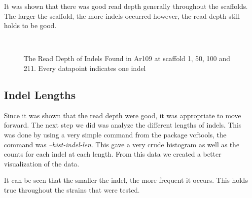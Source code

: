 \documentclass[12pt]{article}
\begin{document}
It was shown that there was good read depth generally throughout the scaffolds. The larger the scaffold, the more indels occurred however, the read depth still holds to be good. 

\begin{figure}[H]
	\begin{centering}
		\\
		\begin{singlespace}
			\vspace{-0.5cm}
			\caption[The Read Depth of Indels Found]{The Read Depth of Indels Found in Ar109 at scaffold 1, 50, 100 and 211. Every datapoint indicates one indel}\label{readdepth_indel}
		\end{singlespace}
	\end{centering}
\end{figure}

\subsection{Indel Lengths}  

Since it was shown that the read depth were good, it was appropriate to move forward. The next step we did was analyze the different lengths of indels. This was done by using a very simple command from the package vcftools, the command was \textit{--hist-indel-len}. This gave a very crude histogram as well as the counts for each indel at each length. From this data we created a better visualization of the data. 

It can be seen that the smaller the indel, the more frequent it occurs. This holds true throughout the strains that were tested.
\end{document}
